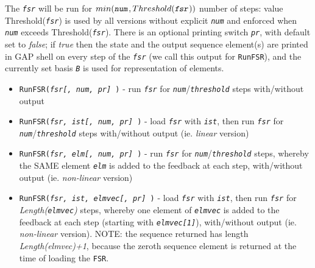 \documentclass[a4paper,11pt]{report}
\begin{document}
{{{ The \mbox{\texttt{\mdseries\slshape fsr}} will be run for $min(\mbox{\texttt{\mdseries\slshape num}} , Threshold(\mbox{\texttt{\mdseries\slshape fsr}}))$ number of steps: value Threshold(\mbox{\texttt{\mdseries\slshape fsr}}) is used by all versions without explicit \mbox{\texttt{\mdseries\slshape num}} and enforced when \mbox{\texttt{\mdseries\slshape num}} exceeds Threshold(\mbox{\texttt{\mdseries\slshape fsr}}). There is an optional printing switch \mbox{\texttt{\mdseries\slshape pr}}, with default set to \emph{false}; if \emph{true} then the state and the output sequence element(s) are printed in \textsf{GAP} shell on every step of the \mbox{\texttt{\mdseries\slshape fsr}} (we call this output for \texttt{RunFSR}), and the currently set basis \mbox{\texttt{\mdseries\slshape B}} is used for representation of elements. 
\begin{itemize}
\item  \texttt{RunFSR(\mbox{\texttt{\mdseries\slshape  fsr[, num, pr] }})} - run \mbox{\texttt{\mdseries\slshape fsr}} for \mbox{\texttt{\mdseries\slshape num}}/\mbox{\texttt{\mdseries\slshape threshold}} steps with/without output
\item  \texttt{RunFSR(\mbox{\texttt{\mdseries\slshape  fsr, ist[, num, pr] }})} - load \mbox{\texttt{\mdseries\slshape fsr}} with \mbox{\texttt{\mdseries\slshape ist}}, then run \mbox{\texttt{\mdseries\slshape fsr}} for \mbox{\texttt{\mdseries\slshape num}}/\mbox{\texttt{\mdseries\slshape threshold}} steps with/without output (ie. \emph{linear} version)
\item  \texttt{RunFSR(\mbox{\texttt{\mdseries\slshape  fsr, elm[, num, pr] }})} - run \mbox{\texttt{\mdseries\slshape fsr}} for \mbox{\texttt{\mdseries\slshape num}}/\mbox{\texttt{\mdseries\slshape threshold}} steps, whereby the SAME element \mbox{\texttt{\mdseries\slshape elm}} is added to the feedback at each step, with/without output (ie. \emph{non-linear} version)
\item  \texttt{RunFSR(\mbox{\texttt{\mdseries\slshape  fsr, ist, elmvec[, pr] }})} - load \mbox{\texttt{\mdseries\slshape fsr}} with \mbox{\texttt{\mdseries\slshape ist}}, then run \mbox{\texttt{\mdseries\slshape fsr}} for \emph{Length(\mbox{\texttt{\mdseries\slshape elmvec}})} steps, whereby one element of \mbox{\texttt{\mdseries\slshape elmvec}} is added to the feedback at each step (starting with \mbox{\texttt{\mdseries\slshape elmvec[1]}}), with/without output (ie. \emph{non-linear} version). NOTE: the sequence returned has length \emph{Length(elmvec)+1}, because the zeroth sequence element is returned at the time of loading the \texttt{FSR}.

\end{itemize}}}}
\end{document}
